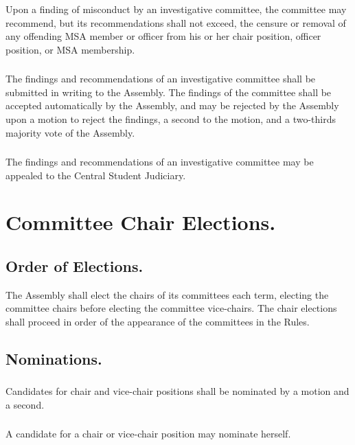 \documentclass{rules}
\begin{document}
\subsubsection{}
Upon a finding of misconduct by an investigative committee, the committee may recommend, but its recommendations shall not exceed, the censure or removal of any offending MSA member or officer from his or her chair position, officer position, or MSA membership.
\subsubsection{}
The findings and recommendations of an investigative committee shall be submitted in writing to the Assembly.  The findings of the committee shall be accepted automatically by the Assembly, and may be rejected by the Assembly upon a motion to reject the findings, a second to the motion, and a two-thirds majority vote of the Assembly.
\subsubsection{}
The findings and recommendations of an investigative committee may be appealed to the Central Student Judiciary.

\section{Committee Chair Elections.}
\subsection{Order of Elections.}
The Assembly shall elect the chairs of its committees each term, electing the committee chairs before electing the committee vice-chairs.  The chair elections shall proceed in order of the appearance of the committees in the Rules.
\subsection{Nominations.}
\subsubsection{}
Candidates for chair and vice-chair positions shall be nominated by a motion and a second.
\subsubsection{}
A candidate for a chair or vice-chair position may nominate herself.
\end{document}
